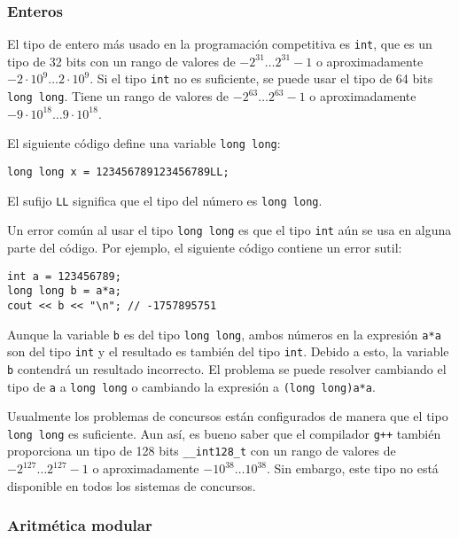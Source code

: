 
\subsubsection{Enteros}

El tipo de entero m\'as usado en la programaci\'on competitiva
es \texttt{int}, que es un tipo de 32 bits con
un rango de valores de $-2^{31} \ldots 2^{31}-1$
o aproximadamente $-2 \cdot 10^9 \ldots 2 \cdot 10^9$.
Si el tipo \texttt{int} no es suficiente,
se puede usar el tipo de 64 bits \texttt{long long}.
Tiene un rango de valores de $-2^{63} \ldots 2^{63}-1$
o aproximadamente $-9 \cdot 10^{18} \ldots 9 \cdot 10^{18}$.

El siguiente c\'odigo define una
variable \texttt{long long}:
\begin{lstlisting}
long long x = 123456789123456789LL;
\end{lstlisting}
El sufijo \texttt{LL} significa que el
tipo del n\'umero es \texttt{long long}.

Un error com\'un al usar el tipo \texttt{long long}
es que el tipo \texttt{int} a\'un se usa en alguna parte
del c\'odigo.
Por ejemplo, el siguiente c\'odigo contiene
un error sutil:

\begin{lstlisting}
int a = 123456789;
long long b = a*a;
cout << b << "\n"; // -1757895751
\end{lstlisting}

Aunque la variable \texttt{b} es del tipo \texttt{long long},
ambos n\'umeros en la expresi\'on \texttt{a*a}
son del tipo \texttt{int} y el resultado es
también del tipo \texttt{int}.
Debido a esto, la variable \texttt{b}
contendr\'a un resultado incorrecto.
El problema se puede resolver cambiando el tipo
de \texttt{a} a \texttt{long long} o
cambiando la expresi\'on a \texttt{(long long)a*a}.

Usualmente los problemas de concursos est\'an configurados de manera que el
tipo \texttt{long long} es suficiente.
Aun as\'i, es bueno saber que
el compilador \texttt{g++} tambi\'en proporciona
un tipo de 128 bits \texttt{\_\_int128\_t}
con un rango de valores de
$-2^{127} \ldots 2^{127}-1$ o aproximadamente $-10^{38} \ldots 10^{38}$.
Sin embargo, este tipo no est\'a disponible en todos los sistemas de concursos.

\subsubsection{Aritm\'etica modular}

